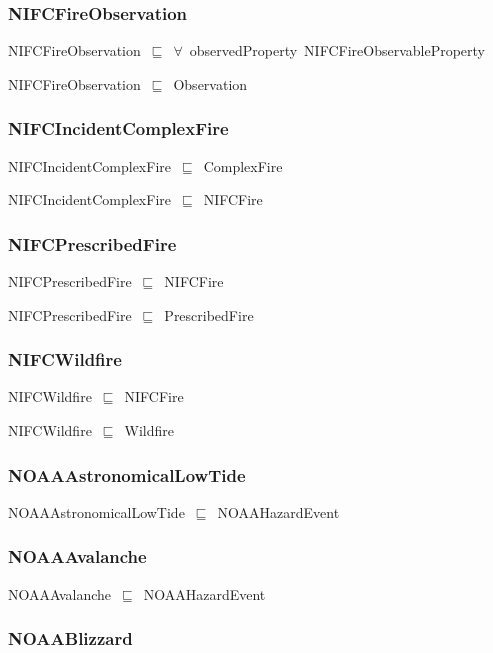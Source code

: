 \documentclass{article}
\begin{document}
\subsubsection*{NIFCFireObservation}

NIFCFireObservation~\ensuremath{\sqsubseteq}~\ensuremath{\forall}~observedProperty~NIFCFireObservableProperty~

NIFCFireObservation~\ensuremath{\sqsubseteq}~Observation~

\subsubsection*{NIFCIncidentComplexFire}

NIFCIncidentComplexFire~\ensuremath{\sqsubseteq}~ComplexFire~

NIFCIncidentComplexFire~\ensuremath{\sqsubseteq}~NIFCFire~

\subsubsection*{NIFCPrescribedFire}

NIFCPrescribedFire~\ensuremath{\sqsubseteq}~NIFCFire~

NIFCPrescribedFire~\ensuremath{\sqsubseteq}~PrescribedFire~

\subsubsection*{NIFCWildfire}

NIFCWildfire~\ensuremath{\sqsubseteq}~NIFCFire~

NIFCWildfire~\ensuremath{\sqsubseteq}~Wildfire~

\subsubsection*{NOAAAstronomicalLowTide}

NOAAAstronomicalLowTide~\ensuremath{\sqsubseteq}~NOAAHazardEvent~

\subsubsection*{NOAAAvalanche}

NOAAAvalanche~\ensuremath{\sqsubseteq}~NOAAHazardEvent~

\subsubsection*{NOAABlizzard}
\end{document}
